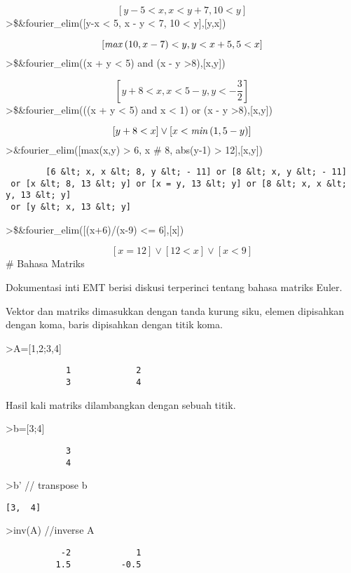 \documentclass[
]{book}
\begin{document}
\[\left[ y-5<x , x<y+7 , 10<y \right] \]\textgreater\$\&fourier\_elim({[}y-x \textless{} 5, x - y \textless{} 7, 10 \textless{} y{]},{[}y,x{]})

\[\left[ {\it max}\left(10 , x-7\right)<y , y<x+5 , 5<x \right] \]\textgreater\$\&fourier\_elim((x + y \textless{} 5) and (x - y \textgreater8),{[}x,y{]})

\[\left[ y+8<x , x<5-y , y<-\frac{3}{2} \right] \]\textgreater\$\&fourier\_elim(((x + y \textless{} 5) and x \textless{} 1) or (x - y \textgreater8),{[}x,y{]})

\[\left[ y+8<x \right] \lor \left[ x<{\it min}\left(1 , 5-y\right)
  \right] \]\textgreater\&fourier\_elim({[}max(x,y) \textgreater{} 6, x \# 8, abs(y-1) \textgreater{} 12{]},{[}x,y{]})

\begin{verbatim}
        [6 &lt; x, x &lt; 8, y &lt; - 11] or [8 &lt; x, y &lt; - 11]
 or [x &lt; 8, 13 &lt; y] or [x = y, 13 &lt; y] or [8 &lt; x, x &lt; y, 13 &lt; y]
 or [y &lt; x, 13 &lt; y]
\end{verbatim}

\textgreater\$\&fourier\_elim({[}(x+6)/(x-9) \textless= 6{]},{[}x{]})

\[\left[ x=12 \right] \lor \left[ 12<x \right] \lor \left[ x<9
  \right] \]\# Bahasa Matriks

Dokumentasi inti EMT berisi diskusi terperinci tentang bahasa matriks Euler.

Vektor dan matriks dimasukkan dengan tanda kurung siku, elemen dipisahkan dengan koma, baris dipisahkan dengan titik koma.

\textgreater A={[}1,2;3,4{]}

\begin{verbatim}
            1             2 
            3             4 
\end{verbatim}

Hasil kali matriks dilambangkan dengan sebuah titik.

\textgreater b={[}3;4{]}

\begin{verbatim}
            3 
            4 
\end{verbatim}

\textgreater b' // transpose b

\begin{verbatim}
[3,  4]
\end{verbatim}

\textgreater inv(A) //inverse A

\begin{verbatim}
           -2             1 
          1.5          -0.5 
\end{verbatim}
\end{document}
